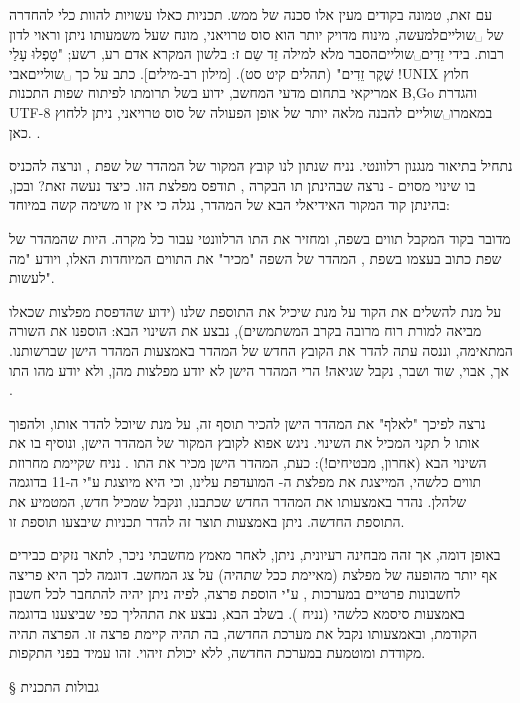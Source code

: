 עם זאת, טמונה בקודים מעין אלו סכנה של ממש. תכניות כאלו עשויות להוות כלי להחדרה של ␣שוליים{למעשה, מינוח מדויק יותר הוא סוס טרויאני, מונח שעל משמעותו ניתן וראוי לדון רבות.} בידי זֵדִים␣שוליים{הסבר מלא למילה זֵד שֵם ז: בלשון המקרא אדם רע, רשע; "טָפְלוּ עָלַי שֶׁקֶר זֵדִים" (תהלים קיט סט). [מילון רב-מילים]}. כתב על כך ␣שוליים{אבי !UNIX חלוץ אמריקאי בתחום מדעי המחשב, ידוע בשל תרומתו לפיתוח שפות התכנות B,Go והגדרת UTF-8} במאמרו␣שוליים {להבנה מלאה יותר של אופן הפעולה של סוס טרויאני, ניתן ללחוץ כאן.
 }.

נתחיל בתיאור מנגנון רלוונטי. נניח שנתון לנו קובץ המקור של המהדר של שפת ,
ונרצה להכניס בו שינוי מסוים - נרצה שבהינתן תו הבקרה , תודפס מפלצת
 הזו. כיצד נעשה זאת? ובכן, בהינתן קוד המקור האידיאלי הבא של המהדר,
נגלה כי אין זו משימה קשה במיוחד:

מדובר בקוד המקבל תווים בשפה, ומחזיר את התו הרלוונטי עבור כל מקרה. היות שהמהדר
של שפת  כתוב בעצמו בשפת , המהדר של השפה "מכיר" את התווים המיוחדות האלו,
ויודע "מה לעשות".

על מנת להשלים את הקוד על מנת שיכיל את התוספת שלנו (ידוע שהדפסת מפלצות
 שכאלו מביאה למורת רוח מרובה בקרב המשתמשים), נבצע את השינוי הבא:
הוספנו את השורה המתאימה, וננסה עתה להדר את הקובץ החדש של המהדר באמצעות המהדר
הישן שברשותנו. אך, אבוי, שוד ושבר, נקבל שגיאה! הרי המהדר הישן לא יודע מפלצות
 מהן, ולא יודע מהו התו .

נרצה לפיכך "לאלף" את המהדר הישן להכיר תוסף זה, על מנת שיוכל להדר אותו, ולהפוך
אותו ל תקני המכיל את השינוי. ניגש אפוא לקובץ המקור של המהדר הישן,
ונוסיף בו את השינוי הבא (אחרון, מבטיחים!): כעת, המהדר הישן מכיר את התו .
נניח שקיימת מחרוזת תווים כלשהי, המייצגת את מפלצת ה- המועדפת עלינו,
וכי היא מיוצגת ע"י ה-11 בדוגמה שלהלן. נהדר באמצעותו את המהדר החדש שכתבנו, ונקבל
  שמכיל  חדש, המטמיע את התוספת החדשה. ניתן
באמצעות תוצר זה להדר תכניות שיבצעו תוספת זו.

באופן דומה, אך זהה מבחינה רעיונית, ניתן, לאחר מאמץ מחשבתי ניכר, לתאר נזקים
כבירים אף יותר מהופעה של מפלצת (מאיימת ככל שתהיה) על צג המחשב. דוגמה לכך היא
פריצה לחשבונות פרטיים במערכות , ע"י הוספת פרצה, לפיה ניתן יהיה להתחבר
לכל חשבון באמצעות סיסמא כלשהי (נניח ). בשלב הבא, נבצע את
התהליך כפי שביצענו בדוגמה הקודמת, ובאמצעותו נקבל את מערכת  החדשה, בה
תהיה קיימת פרצה זו. הפרצה תהיה מקודדת ומוטמעת במערכת החדשה, ללא יכולת זיהוי.
זהו  עמיד בפני התקפות.

§ גבולות התכנית

